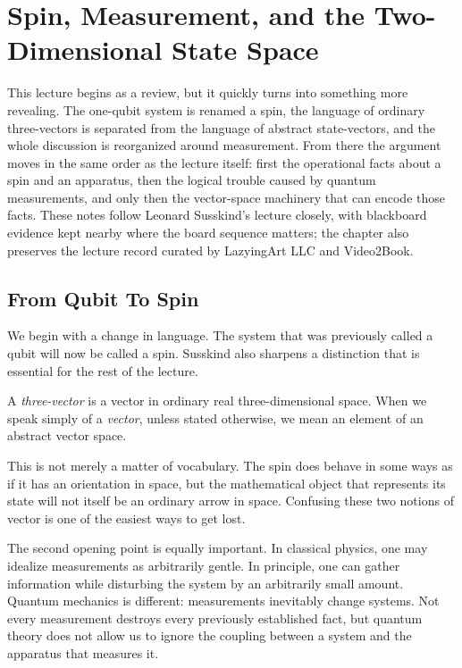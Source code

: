 \chapter{Spin, Measurement, and the Two-Dimensional State Space}

This lecture begins as a review, but it quickly turns into something more revealing. The one-qubit system is renamed a spin, the language of ordinary three-vectors is separated from the language of abstract state-vectors, and the whole discussion is reorganized around measurement. From there the argument moves in the same order as the lecture itself: first the operational facts about a spin and an apparatus, then the logical trouble caused by quantum measurements, and only then the vector-space machinery that can encode those facts. These notes follow Leonard Susskind's lecture closely, with blackboard evidence kept nearby where the board sequence matters; the chapter also preserves the lecture record curated by LazyingArt LLC and Video2Book.

\section{From Qubit To Spin}

We begin with a change in language. The system that was previously called a qubit will now be called a spin. Susskind also sharpens a distinction that is essential for the rest of the lecture.

\begin{definition}
A \emph{three-vector} is a vector in ordinary real three-dimensional space. When we speak simply of a \emph{vector}, unless stated otherwise, we mean an element of an abstract vector space.
\end{definition}

This is not merely a matter of vocabulary. The spin does behave in some ways as if it has an orientation in space, but the mathematical object that represents its state will not itself be an ordinary arrow in space. Confusing these two notions of vector is one of the easiest ways to get lost.

The second opening point is equally important. In classical physics, one may idealize measurements as arbitrarily gentle. In principle, one can gather information while disturbing the system by an arbitrarily small amount. Quantum mechanics is different: measurements inevitably change systems. Not every measurement destroys every previously established fact, but quantum theory does not allow us to ignore the coupling between a system and the apparatus that measures it.

